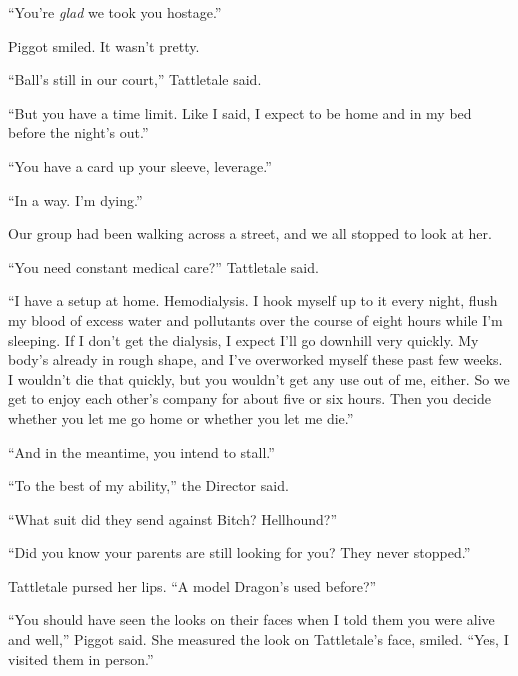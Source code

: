 ``You're \emph{glad} we took you hostage.''



Piggot smiled.  It wasn't pretty.



``Ball's still in our court,'' Tattletale said.



``But you have a time limit.  Like I said, I expect to be home and in my bed before the night's out.''



``You have a card up your sleeve, leverage.''



``In a way.  I'm dying.''



Our group had been walking across a street, and we all stopped to look at her.



``You need constant medical care?'' Tattletale said.



``I have a setup at home.  Hemodialysis.  I hook myself up to it every night, flush my blood of excess water and pollutants over the course of eight hours while I'm sleeping.  If I don't get the dialysis, I expect I'll go downhill very quickly.  My body's already in rough shape, and I've overworked myself these past few weeks.  I wouldn't die that quickly, but you wouldn't get any use out of me, either.  So we get to enjoy each other's company for about five or six hours.  Then you decide whether you let me go home or whether you let me die.''



``And in the meantime, you intend to stall.''



``To the best of my ability,'' the Director said.



``What suit did they send against Bitch?  Hellhound?''



``Did you know your parents are still looking for you?  They never stopped.''



Tattletale pursed her lips.  ``A model Dragon's used before?''



``You should have seen the looks on their faces when I told them you were alive and well,'' Piggot said.  She measured the look on Tattletale's face, smiled.  ``Yes, I visited them in person.''



